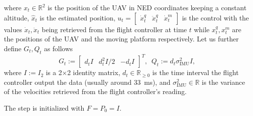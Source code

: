 \documentclass[conference]{IEEEtran}
\begin{document}
where $x_t\in\mathbb{R}^2$ is the position of the UAV in NED coordinates keeping a constant altitude, $\hat{x}_{t}$ is the estimated position, $u_t=\begin{bmatrix}{\dot{x}}_t^q & {\ddot{x}}_t^q & {\dot{x}}_t^m \end{bmatrix}$ is the control with the values ${\dot{x}}_t,{\ddot{x}}_t$ being retrieved from the flight controller at time $t$ while ${x}_t^q,{x}_t^m$ are the positions of the UAV and the moving platform respectively. Let us further define $G_t,Q_t$ as follows
\begin{equation} 
G_t:=\begin{bmatrix} d_tI & d_t^2I/2 & -d_tI \end{bmatrix}^T,\,\,\,
Q_t:=d_t\sigma^{2}_{\text{IMU}}I,
\end{equation}
where $I:=I_2$ is a 2$\times$2 identity matrix, $d_t\in\mathbb{R}_{\geq 0}$ is the time interval the flight controller output the data (usually around \SI{33}{ms}), and \(\sigma^{2}_{\text{IMU}}\in\mathbb{R}\) is the variance of the velocities retrieved from the flight controller's reading. 

The step is initialized with $F=P_0=I$.
\end{document}
